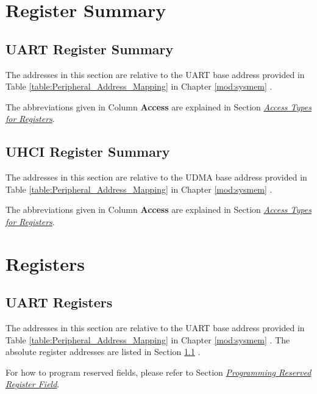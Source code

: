 \documentclass[main\_\_EN.tex]{subfiles}
\begin{document}
\hypertarget{uart-reg-summ}{}
\section{Register Summary}

\subsection{UART Register Summary}\label{sec:uart-seg-summ}

The addresses in this section are relative to the UART base address provided in Table \ref{table:Peripheral_Address_Mapping} in Chapter \ref{mod:sysmem} \textit{}.

The abbreviations given in Column \textbf{Access} are explained in Section \hyperref[glossary-access-types]{\textit{Access Types for Registers}}.



\subsection{UHCI Register Summary}\label{sec:uhci-seg-summ}

The addresses in this section are relative to the UDMA base address provided in Table \ref{table:Peripheral_Address_Mapping} in Chapter \ref{mod:sysmem} \textit{}.

The abbreviations given in Column \textbf{Access} are explained in Section \hyperref[glossary-access-types]{\textit{Access Types for Registers}}.


{\clearpage}

\section{Registers}

\subsection{UART Registers}

The addresses in this section are relative to the UART base address provided in Table \ref{table:Peripheral_Address_Mapping} in Chapter \ref{mod:sysmem} \textit{}. The absolute register addresses are listed in Section \ref{sec:uart-seg-summ} \textit{}. 

For how to program reserved fields, please refer to Section \hyperref[programming-reserved-field]{\textit{Programming Reserved Register Field}}.
\end{document}
